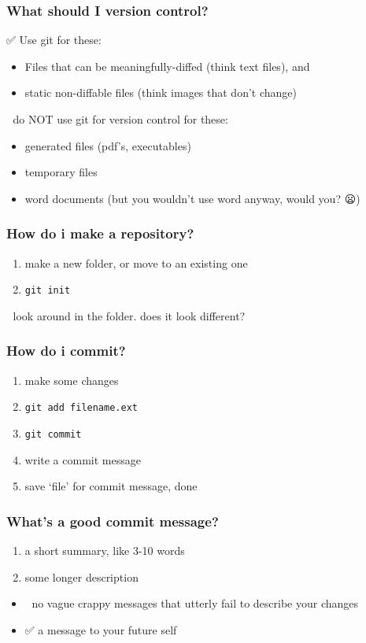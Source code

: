 \documentclass[14pt,aspectratio=1610]{beamer} %
\newcommand{\fframe}[2]{
   \begin{frame}
\frametitle{#1}
#2
\end{frame}
}
\begin{document}
\fframe{What should I version control?}
{
	✅ Use git for these: 
	\begin{itemize}
		\item Files that can be meaningfully-diffed (think text files), and 
		\item static non-diffable files (think images that don't change)
	\end{itemize}

\vspace{\baselineskip}

	🚫 do NOT use git for version control for these:
	\begin{itemize}
		\item generated files (pdf's, executables)
		\item temporary files
		\item word documents (but you wouldn't use word anyway, would you? 😦)
	\end{itemize}
}






\fframe{How do i make a repository?}
{
	\begin{enumerate}
		\item make a new folder, or move to an existing one
		\item {\tt git init}
	\end{enumerate}

\vspace{\baselineskip}

👀	look around in the folder.  does it look different?
}


\fframe{How do i commit?}
{
	\begin{enumerate}
		\item make some changes
		\item {\tt git add filename.ext}
		\item {\tt git commit}
		\item write a commit message
		\item save `file' for commit message, done
	\end{enumerate}
}

\fframe{What's a good commit message?}
{
	\begin{enumerate}
		\item a short summary, like 3-10 words
		\item some longer description
	\end{enumerate}

\begin{itemize}
		\item 🚫 no vague crappy messages that utterly fail to describe your changes
		\item ✅ a message to your future self
	\end{itemize}
}
\end{document}
